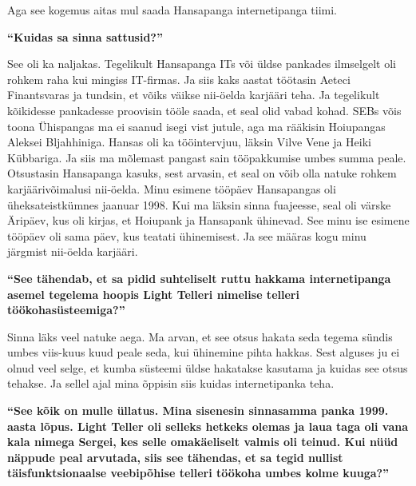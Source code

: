 Aga see kogemus aitas mul saada Hansapanga internetipanga tiimi.

\textbf{\enquote{Kuidas sa sinna sattusid?}}

See oli ka naljakas. Tegelikult Hansapanga ITs või üldse pankades ilmselgelt oli rohkem raha kui mingiss IT-firmas. Ja siis kaks aastat töötasin Aeteci Finantsvaras ja tundsin, et võiks väikse nii-öelda karjääri teha. Ja tegelikult kõikidesse pankadesse proovisin tööle saada, et seal olid vabad kohad. SEBs võis toona Ühispangas ma ei saanud isegi vist jutule, aga ma rääkisin Hoiupangas Aleksei Bljahhiniga. Hansas oli ka tööintervjuu, läksin Vilve Vene ja Heiki Kübbariga. Ja siis ma mõlemast pangast sain tööpakkumise umbes summa peale. Otsustasin Hansapanga kasuks, sest arvasin, et seal on võib olla natuke rohkem karjäärivõimalusi nii-öelda. Minu esimene tööpäev Hansapangas oli üheksateistkümnes jaanuar 1998. Kui ma läksin sinna fuajeesse, seal oli värske Äripäev, kus oli kirjas, et Hoiupank ja Hansapank ühinevad. See minu ise esimene tööpäev oli sama päev, kus teatati ühinemisest. Ja see määras kogu minu järgmist nii-öelda karjääri.


\textbf{\enquote{See tähendab, et sa pidid suhteliselt ruttu hakkama internetipanga asemel tegelema hoopis Light Telleri nimelise telleri töökohasüsteemiga?}}

Sinna läks veel natuke aega. Ma arvan, et see otsus hakata seda tegema sündis umbes viis-kuus kuud peale seda, kui ühinemine pihta hakkas. Sest alguses ju  ei olnud veel selge, et kumba süsteemi üldse hakatakse kasutama ja kuidas see otsus tehakse. Ja sellel ajal mina õppisin siis kuidas internetipanka teha.

\textbf{\enquote{See kõik on mulle üllatus. Mina sisenesin sinnasamma panka 1999. aasta lõpus. Light Teller oli selleks hetkeks olemas ja laua taga oli vana kala nimega Sergei, kes selle omakäeliselt valmis oli teinud. Kui nüüd näppude peal arvutada, siis see tähendas, et sa tegid nullist täisfunktsionaalse veebipõhise telleri töökoha umbes kolme kuuga?}}

